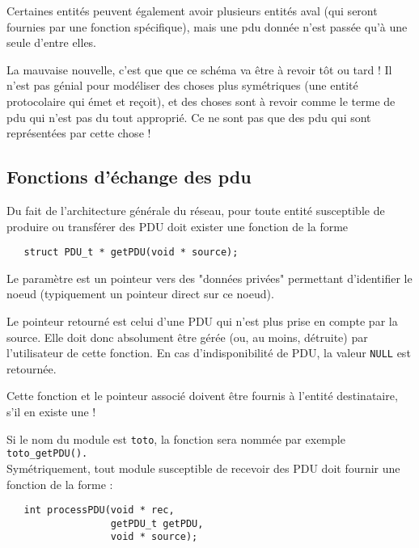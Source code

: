    Certaines entités peuvent également avoir plusieurs entités aval
(qui seront fournies par une fonction spécifique), mais une {\sc pdu}
donnée n'est passée qu'à une seule d'entre elles.

   La mauvaise nouvelle, c'est que que ce schéma va être à revoir tôt
ou tard ! Il n'est pas génial pour modéliser des choses plus
symétriques (une entité protocolaire qui émet et reçoit), et des
choses sont à revoir comme le terme de {\sc pdu} qui n'est pas du tout
approprié. Ce ne sont pas que des {\sc pdu} qui sont représentées par
cette chose !

%
\subsection{Fonctions d'échange des {\sc pdu}}

   Du fait de l'architecture générale du réseau, pour toute entité susceptible
de produire ou transférer des PDU doit exister une fonction de la forme

\begin{verbatim}
   struct PDU_t * getPDU(void * source);
\end{verbatim}

   Le paramètre est un pointeur vers des "données privées" permettant
d'identifier le noeud (typiquement un pointeur direct sur ce noeud).

   Le pointeur retourné est celui d'une PDU qui n'est plus prise en
compte par la source. Elle doit donc absolument être gérée (ou, au
moins, détruite) par l'utilisateur de cette fonction. En cas
d'indisponibilité de PDU, la valeur {\tt NULL} est retournée.

   Cette fonction et le pointeur associé doivent être fournis à
l'entité destinataire, s'il en existe une !

   Si le nom du module est {\tt toto}, la fonction sera nommée par exemple
{\tt toto\_getPDU().}\\

   Symétriquement, tout module susceptible de recevoir des PDU doit fournir une
fonction de la forme :


\begin{verbatim}
   int processPDU(void * rec,
                  getPDU_t getPDU,
                  void * source);
\end{verbatim}

